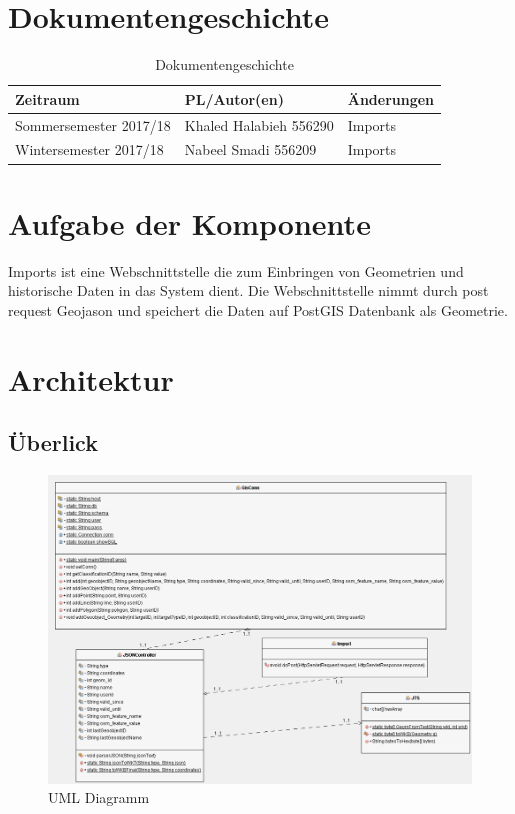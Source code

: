 \section{Dokumentengeschichte}
\begin{table}[h]
 \begin{tabular}{|l|l|p{4cm}|}
 \hline
 Zeitraum & PL/Autor(en) & Änderungen \\
 \hline
 Sommersemester 2017/18 & Khaled Halabieh 556290  & 
Imports
 
  \\
 \hline
 Wintersemester 2017/18 & Nabeel Smadi 556209 & 
Imports


  \\
 \hline
 \end{tabular}
 \caption{Dokumentengeschichte}
 \end{table}

\section{Aufgabe der Komponente}

Imports ist eine Webschnittstelle die zum Einbringen von Geometrien und historische Daten in das System dient.
Die Webschnittstelle nimmt durch post request Geojason und speichert die Daten auf PostGIS Datenbank als Geometrie.

\section{Architektur}

\subsection{Überlick}


\begin{figure}[h]
\centering
\includegraphics[page=1, width=127mm]{importer2/pic/UmlImporter.png}
\caption{UML Diagramm}
\label{fig:UmlImporter}
\end{figure}



